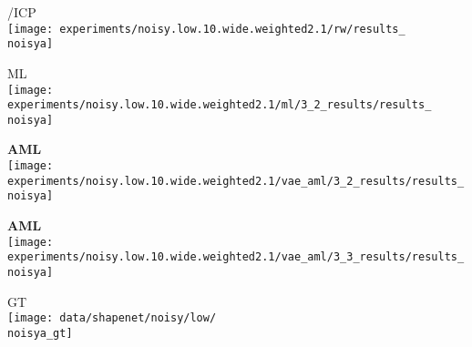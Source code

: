 {\begin{minipage}[t]{0.10\textwidth}
    \scriptsize \cite{Engelmann2016GCPR}/ICP\\[-1px]
   	\texttt{[image: experiments/noisy.low.10.wide.weighted2.1/rw/results\_\\noisya]}
\end{minipage}
\begin{minipage}[t]{0.10\textwidth}
    \vspace{0px}\centering
    \hspace*{3mm}
    ML\\[-1px]
    \texttt{[image: experiments/noisy.low.10.wide.weighted2.1/ml/3\_2\_results/results\_\\noisya]}
\end{minipage}
\begin{minipage}[t]{0.10\textwidth}
   	\vspace{0px}\centering
    \hspace*{3mm}
   	{\bf\color{MPIIorange} AML}\\[-1px]
   	\texttt{[image: experiments/noisy.low.10.wide.weighted2.1/vae\_aml/3\_2\_results/results\_\\noisya]}
\end{minipage}
\begin{minipage}[t]{0.10\textwidth}
   	\vspace{0px}\centering
    \hspace*{3mm}
   	{\bf\color{MPIIorange} AML}\\[-1px]
   	\texttt{[image: experiments/noisy.low.10.wide.weighted2.1/vae\_aml/3\_3\_results/results\_\\noisya]}
\end{minipage}
\begin{minipage}[t]{0.10\textwidth}
   	\vspace{0px}\centering
    \hspace*{3mm}
   	GT\\[-1px]
   	\texttt{[image: data/shapenet/noisy/low/\\noisya\_gt]}

\end{minipage}}
